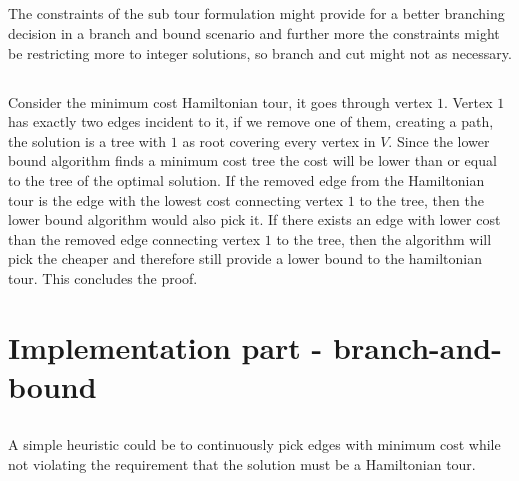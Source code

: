 \subsection{} %
The constraints of the sub tour formulation might provide for a better branching decision in a branch and bound scenario and further more the constraints might be restricting more to integer solutions, so branch and cut might not as necessary. 

\subsection{} %
Consider the minimum cost Hamiltonian tour, it goes through vertex $1$. Vertex $1$ has exactly two edges incident to it, if we remove one of them, creating a path, the solution is a tree with $1$ as root covering every vertex in $V$. Since the lower bound algorithm finds a minimum cost tree the cost will be lower than or equal to the tree of the optimal solution. If the removed edge from the Hamiltonian tour is the edge with the lowest cost connecting vertex $1$ to the tree, then the lower bound algorithm would also pick it. If there exists an edge with lower cost than the removed edge connecting vertex $1$ to the tree, then the algorithm will pick the cheaper and therefore still  provide a lower bound to the hamiltonian tour. This concludes the proof. 

\section{Implementation part - branch-and-bound}
\subsection{}
A simple heuristic could be to continuously pick edges with minimum cost while not violating the requirement that the solution must be a Hamiltonian tour.

\subsection{}

\subsection{}